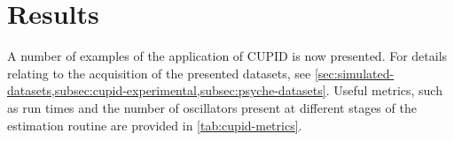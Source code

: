 \section{Results}
\label{subsec:cupid-results}

A number of examples of the application of \ac{CUPID} is now presented.
For details relating to the acquisition of the presented datasets, see
\cref{sec:simulated-datasets,subsec:cupid-experimental,subsec:psyche-datasets}.
Useful metrics, such as run times and the number of oscillators present at
different stages of the estimation routine are provided in
\cref{tab:cupid-metrics}.

